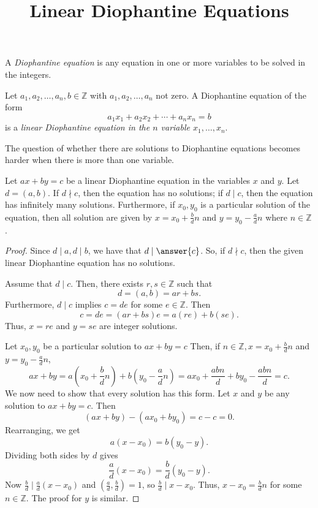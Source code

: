 \documentclass{../ximera}
\title{Linear Diophantine Equations}
\begin{document}
\begin{abstract}
\end{abstract}
\maketitle


\begin{definition}
    A \emph{Diophantine equation} is any equation in one or more variables to be solved in the integers.
\end{definition}
    
    
\begin{definition}
    Let $a_1,a_2,\dots,a_n,b\in\mathbb{Z}$ with $a_1,a_2,\dots,a_n$ not zero. A Diophantine equation of the form \[a_1x_1+a_2x_2+\cdots+a_nx_n=b\] is a \emph{linear Diophantine equation in the $n$ variable $x_1,\dots,x_n$}.
\end{definition}
    
The question of whether there are solutions to Diophantine equations becomes harder when there is more than one variable.
    
\begin{theorem}\label{thm:linear-dioph}
    Let $ax+by=c$ be a linear Diophantine equation in the variables $x$ and $y$. Let $d=(a,b)$. If $d\nmid c$, then the equation has no solutions; if $d\mid c$, then the equation has infinitely many solutions. Furthermore, if $x_0,y_0$ is a particular solution of the equation, then all solution are given by $x=x_0+\frac{b}{d}n$ and $y=y_0-\frac{a}{d}n$ where $n\in\mathbb{Z}$.
   
    \begin{proof}
        Since $d\mid a,d\mid b$, we have that $d\mid\answer{c}$. So, if $d\nmid c$, then the given linear Diophantine equation has no solutions.
     
        Assume that $d\mid c$. Then, there exists $r,s\in\mathbb{Z}$ such that \[d=(a,b)=ar+bs.\] Furthermore, $d\mid c$ implies $c=de$ for some $e\in\mathbb{Z}$. Then \[c=de=(ar+bs)e=a(re)+b(se).\]
        Thus, $x=re$ and $y=se$ are integer solutions.
     
        Let $x_0,y_0$ be a particular solution to $ax+by=c$ Then, if $n\in\mathbb{Z}, x=x_0+\frac{b}{d}n$ and $y=y_0-\frac{a}{d}n$, \[ax+by=a(x_0+\frac{b}{d}n)+b(y_0-\frac{a}{d}n)=ax_0+\frac{abn}{d}+by_0-\frac{abn}{d}=c.\] We now need to show that every solution has this form. Let $x$ and $y$ be any solution to $ax+by=c$. Then \[(ax+by)-(ax_0+by_0)=c-c=0.\] Rearranging, we get \[a(x-x_0)=b(y_0-y).\] Dividing both sides by $d$ gives \[\frac{a}{d}(x-x_0)=\frac{b}{d}(y_0-y).\] Now $\frac{b}{d}\mid \frac{a}{d}(x-x_0)$ and $(\frac{a}{d},\frac{b}{d})=1$, so $\frac{b}{d}\mid x-x_0$. Thus, $x-x_0=\frac{b}{d}n$ for some $n\in\mathbb{Z}$. The proof for $y$ is similar.
    \end{proof}
\end{theorem}
    
\end{document}
